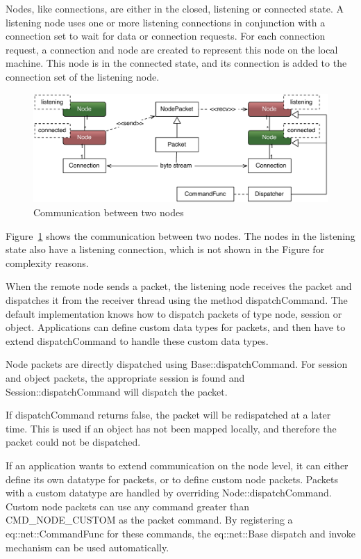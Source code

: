 \documentclass[10pt,a4]{scrartcl}
\newcommand{\fig}[1]{Figure~\ref{#1}}
\begin{document}
Nodes, like connections, are either in the closed, listening or
connected state. A listening node uses one or more listening connections
in conjunction with a connection set to wait for data or connection
requests. For each connection request, a connection and node are created
to represent this node on the local machine. This node is in the
connected state, and its connection is added to the connection set of
the listening node.

\begin{figure}
  \includegraphics[width=.618\textwidth]{images/netNode.pdf}
  {\caption{\label{fNetNode}Communication between two nodes}}
\end{figure}
\fig{fNetNode} shows the communication between two nodes. The nodes in
the listening state also have a listening connection, which is not shown
in the Figure for complexity reasons.

When the remote node sends a packet, the listening node receives the
packet and dispatches it from the receiver thread using the method
\textsf{dispatchCommand}. The default implementation knows how to
dispatch packets of type node, session or object. Applications can
define custom data types for packets, and then have to extend
\textsf{dispatchCommand} to handle these custom data types.

Node packets are directly dispatched using
\textsf{Base::dispatchCommand}. For session and object packets, the
appropriate session is found and \textsf{Session::dispatchCommand} will
dispatch the packet.

If \textsf{dispatchCommand} returns false, the packet will be
redispatched at a later time. This is used if an object has not been
mapped locally, and therefore the packet could not be dispatched.

If an application wants to extend communication on the node level, it
can either define its own datatype for packets, or to define custom node
packets. Packets with a custom datatype are handled by overriding
\textsf{Node::dispatchCommand}. Custom node packets can use any command
greater than \textsf{CMD\_NODE\_CUSTOM} as the packet command. By
registering a \textsf{eq::net::CommandFunc} for these commands, the
\textsf{eq::net::Base} dispatch and invoke mechanism can be used
automatically.
\end{document}
